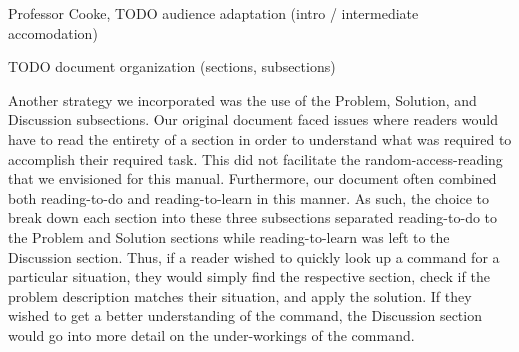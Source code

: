 \documentclass[12pt]{letter}
\newcounter{section}
\newcounter{subsection}[section]
\begin{document}
\begin{letter}{Professor Cooke,}
TODO audience adaptation (intro / intermediate accomodation)

TODO document organization (sections, subsections)

Another strategy we incorporated was the use of the Problem, Solution, and Discussion subsections.  Our original document faced issues where readers would have to read the entirety of a section in order to understand what was required to accomplish their required task.  This did not facilitate the random-access-reading that we envisioned for this manual.  Furthermore, our document often combined both reading-to-do and reading-to-learn in this manner.  As such, the choice to break down each section into these three subsections separated reading-to-do to the Problem and Solution sections while reading-to-learn was left to the Discussion section.  Thus, if a reader wished to quickly look up a command for a particular situation, they would simply find the respective section, check if the problem description matches their situation, and apply the solution.  If they wished to get a better understanding of the command, the Discussion section would go into more detail on the under-workings of the command.

\end{letter}
\end{document}
